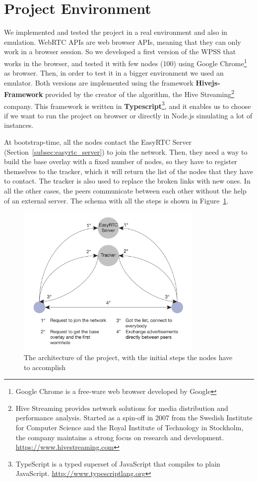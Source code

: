 \section{Project Environment}
\label{cha:design}
We implemented and tested the project in a real environment and also in emulation. WebRTC APIs are web browser APIs, meaning that they can only work in a browser session. So we developed a first version of the \ac{WPSS} that works in the browser, and tested it with few nodes (100) using Google Chrome\footnote{Google Chrome is a free-ware web browser developed by Google} as browser. Then, in order to test it in a bigger environment we used an emulator. Both versions are implemented using the framework \textbf{Hivejs-Framework} provided by the creator of the algorithm, the Hive Streaming\footnote{Hive Streaming provides network solutions for media distribution and performance analysis. Started as a spin-off in 2007 from the Swedish Institute for Computer Science and the Royal Institute of Technology in Stockholm, the company maintains a strong focus on research and development. \url{https://www.hivestreaming.com}} company. This framework is written in \textbf{Typescript}\footnote{TypeScript is a typed superset of JavaScript that compiles to plain JavaScript. \url{http://www.typescriptlang.org}}, and it enables us to choose if we want to run the project on browser or directly in Node.js simulating a lot of instances. 

At bootstrap-time, all the nodes contact the EasyRTC Server (Section~\ref{subsec:easyrtc_server}) to join the network. Then, they need a way to build the base overlay with a fixed number of nodes, so they have to register themselves to the tracker, which it will return the list of the nodes that they have to contact. The tracker is also used to replace the broken links with new ones. In all the other cases, the peers communicate between each other without the help of an external server. The schema with all the steps is shown in Figure~\ref{fig:project_architecture}.

\begin{figure}[ht]
  \centering
  \includegraphics[keepaspectratio=true, width=0.8\textwidth]{images/project_architecture}\caption{The architecture of the project, with the initial steps the nodes have to accomplish}
  \label{fig:project_architecture}
\end{figure}



